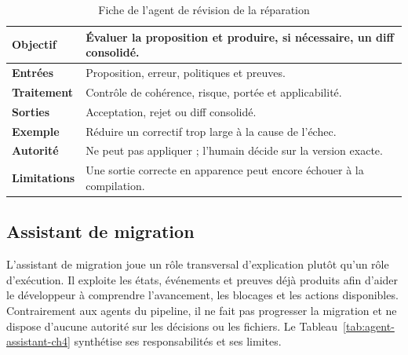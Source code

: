 \begin{table}[H]
    \centering
    \caption{Fiche de l'agent de révision de la réparation}
    \label{tab:agent-review-reparation-ch4}
    \small
    \begin{tabularx}{\textwidth}{|>{\bfseries\RaggedRight\arraybackslash}p{3.1cm}|>{\RaggedRight\arraybackslash}X|}
        \hline
        Objectif & Évaluer la proposition et produire, si nécessaire, un diff consolidé. \\
        \hline
        Entrées & Proposition, erreur, politiques et preuves. \\
        \hline
        Traitement & Contrôle de cohérence, risque, portée et applicabilité. \\
        \hline
        Sorties & Acceptation, rejet ou diff consolidé. \\
        \hline
        Exemple & Réduire un correctif trop large à la cause de l'échec. \\
        \hline
        Autorité & Ne peut pas appliquer ; l'humain décide sur la version exacte. \\
        \hline
        Limitations & Une sortie correcte en apparence peut encore échouer à la compilation. \\
        \hline
    \end{tabularx}
\end{table}

\subsection{Assistant de migration}

L'assistant de migration joue un rôle transversal d'explication plutôt qu'un rôle d'exécution. Il exploite les états, événements et preuves déjà produits afin d'aider le développeur à comprendre l'avancement, les blocages et les actions disponibles. Contrairement aux agents du pipeline, il ne fait pas progresser la migration et ne dispose d'aucune autorité sur les décisions ou les fichiers. Le Tableau~\ref{tab:agent-assistant-ch4} synthétise ses responsabilités et ses limites.

